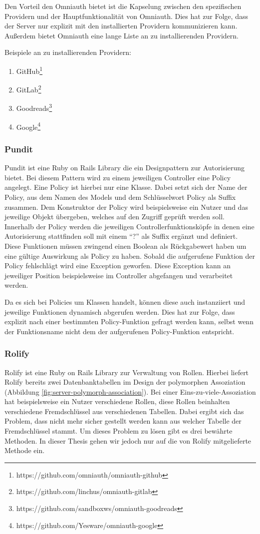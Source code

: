 Den Vorteil den Omniauth bietet ist die Kapselung zwischen den spezifischen Providern und der Hauptfunktionalität von Omniauth. Dies hat zur Folge, dass der Server nur explizit mit den installierten Providern kommunizieren kann. Außerdem bietet Omniauth eine lange Liste an zu installierenden Providern.

Beispiele an zu installierenden Providern: 
\begin{enumerate} 
	\item GitHub\footnote{https://github.com/omniauth/omniauth-github}
	\item GitLab\footnote{https://github.com/linchus/omniauth-gitlab}
	\item Goodreads\footnote{https://github.com/sandboxws/omniauth-goodreads}
	\item Google\footnote{https://github.com/Yesware/omniauth-google}
\end{enumerate}

\subsubsection{Pundit}
\label{sec: pundit}
Pundit ist eine Ruby on Rails Library die ein Designpattern zur Autorisierung bietet. Bei diesem Pattern wird zu einem jeweiligen Controller eine Policy angelegt. Eine Policy ist hierbei nur eine Klasse. Dabei setzt sich der Name der Policy, aus dem Namen des Models und dem Schlüsselwort Policy als Suffix zusammen. Dem Konstruktor der Policy wird beispielsweise ein Nutzer und das jeweilige Objekt übergeben, welches auf den Zugriff geprüft werden soll. Innerhalb der Policy werden die jeweiligen Controllerfunktionsköpfe in denen eine Autorisierung stattfinden soll mit einem \enquote{?} als Suffix ergänzt und definiert. Diese Funktionen müssen zwingend einen Boolean als Rückgabewert haben um eine gültige Auswirkung als Policy zu haben. Sobald die aufgerufene Funktion der Policy fehlschlägt wird eine Exception geworfen. Diese Exception kann an jeweiliger Position beispielsweise im Controller abgefangen und verarbeitet werden.

Da es sich bei Policies um Klassen handelt, können diese auch instanziiert und jeweilige Funktionen dynamisch abgerufen werden. Dies hat zur Folge, dass explizit nach einer bestimmten Policy-Funktion gefragt werden kann, selbst wenn der Funktionsname nicht dem der aufgerufenen Policy-Funktion entspricht.

\subsubsection{Rolify}
\label{sec: rolify}
Rolify ist eine Ruby on Rails Library zur Verwaltung von Rollen. Hierbei liefert Rolify bereits zwei Datenbanktabellen im Design der polymorphen Assoziation (Abbildung \ref{fig:server-polymorph-association}). Bei einer Eins-zu-viele-Assoziation hat beispielsweise ein Nutzer verschiedene Rollen, diese Rollen beinhalten verschiedene Fremdschlüssel aus verschiedenen Tabellen. Dabei ergibt sich das Problem, dass nicht mehr sicher gestellt werden kann aus welcher Tabelle der Fremdschlüssel stammt. Um dieses Problem zu lösen gibt es drei bewährte Methoden. In dieser Thesis gehen wir jedoch nur auf die von Rolify mitgelieferte Methode ein.

